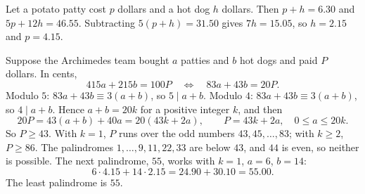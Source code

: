 Let a potato patty cost $p$ dollars and a hot dog $h$ dollars. Then $p+h=6.30$ and $5p+12h=46.55$. Subtracting $5(p+h)=31.50$ gives $7h=15.05$, so $h=2.15$ and $p=4.15$.

Suppose the Archimedes team bought $a$ patties and $b$ hot dogs and paid $P$ dollars. In cents,
\[
415a+215b=100P\quad\Longleftrightarrow\quad 83a+43b=20P .
\]
Modulo $5$: $83a+43b\equiv3(a+b)$, so $5\mid a+b$. Modulo $4$: $83a+43b\equiv3(a+b)$, so $4\mid a+b$. Hence $a+b=20k$ for a positive integer $k$, and then
\[
20P=43(a+b)+40a=20(43k+2a),\qquad P=43k+2a,\quad 0\le a\le20k .
\]
So $P\ge43$. With $k=1$, $P$ runs over the odd numbers $43,45,\dots,83$; with $k\ge2$, $P\ge86$. The palindromes $1,\dots,9,11,22,33$ are below $43$, and $44$ is even, so neither is possible. The next palindrome, $55$, works with $k=1$, $a=6$, $b=14$:
\[
6\cdot4.15+14\cdot2.15=24.90+30.10=55.00 .
\]
The least palindrome is $\boxed{55}$.
